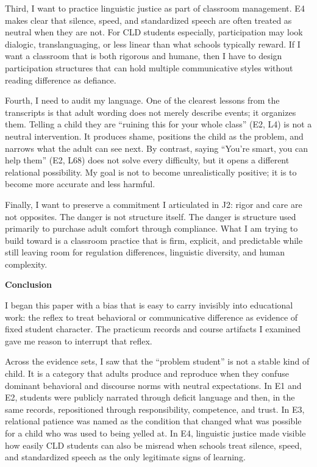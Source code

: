 \documentclass[12pt]{article}
\newcommand{\levelone}[1]{\begin{center}\textbf{#1}\end{center}}
\newcommand{\EvidenceSet}[1]{\textsc{E#1}}
\newcommand{\JournalArtifact}[1]{\textsc{J#1}}
\begin{document}
Third, I want to practice linguistic justice as part of classroom management. \EvidenceSet{4} makes clear that silence, speed, and standardized speech are often treated as neutral when they are not. For CLD students especially, participation may look dialogic, translanguaging, or less linear than what schools typically reward. If I want a classroom that is both rigorous and humane, then I have to design participation structures that can hold multiple communicative styles without reading difference as defiance.

Fourth, I need to audit my language. One of the clearest lessons from the transcripts is that adult wording does not merely describe events; it organizes them. Telling a child they are ``ruining this for your whole class'' (\EvidenceSet{2}, L4) is not a neutral intervention. It produces shame, positions the child as the problem, and narrows what the adult can see next. By contrast, saying ``You're smart, you can help them'' (\EvidenceSet{2}, L68) does not solve every difficulty, but it opens a different relational possibility. My goal is not to become unrealistically positive; it is to become more accurate and less harmful.

Finally, I want to preserve a commitment I articulated in \JournalArtifact{2}: rigor and care are not opposites. The danger is not structure itself. The danger is structure used primarily to purchase adult comfort through compliance. What I am trying to build toward is a classroom practice that is firm, explicit, and predictable while still leaving room for regulation differences, linguistic diversity, and human complexity.

\levelone{Conclusion}

I began this paper with a bias that is easy to carry invisibly into educational work: the reflex to treat behavioral or communicative difference as evidence of fixed student character. The practicum records and course artifacts I examined gave me reason to interrupt that reflex.

Across the evidence sets, I saw that the ``problem student'' is not a stable kind of child. It is a category that adults produce and reproduce when they confuse dominant behavioral and discourse norms with neutral expectations. In \EvidenceSet{1} and \EvidenceSet{2}, students were publicly narrated through deficit language and then, in the same records, repositioned through responsibility, competence, and trust. In \EvidenceSet{3}, relational patience was named as the condition that changed what was possible for a child who was used to being yelled at. In \EvidenceSet{4}, linguistic justice made visible how easily CLD students can also be misread when schools treat silence, speed, and standardized speech as the only legitimate signs of learning.
\end{document}
